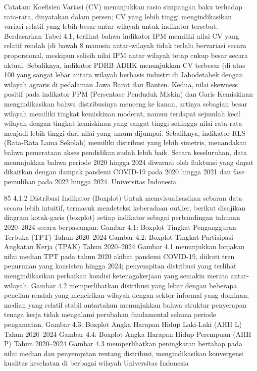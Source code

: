 Catatan: Koefisien Variasi (CV) menunjukkan rasio simpangan baku terhadap rata-rata,
dinyatakan dalam persen; CV yang lebih tinggi mengindikasikan variasi relatif yang lebih
besar antar-wilayah untuk indikator tersebut.
Berdasarkan Tabel 4.1, terlihat bahwa indikator IPM memiliki nilai CV yang relatif
rendah (di bawah 8%
manusia antar-wilayah tidak terlalu bervariasi secara proporsional, meskipun selisih nilai
IPM antar wilayah tetap cukup besar secara aktual. Sebaliknya, indikator PDRB ADHK
menunjukkan CV terbesar (di atas 100%
yang sangat lebar antara wilayah berbasis industri di Jabodetabek dengan wilayah agraris
di pedalaman Jawa Barat dan Banten.
Kedua, nilai skewness positif pada indikator PPM (Persentase Penduduk Miskin)
dan Garis Kemiskinan mengindikasikan bahwa distribusinya menceng ke kanan, artinya
sebagian besar wilayah memiliki tingkat kemiskinan moderat, namun terdapat sejumlah
kecil wilayah dengan tingkat kemiskinan yang sangat tinggi sehingga nilai rata-rata menjadi
lebih tinggi dari nilai yang umum dijumpai. Sebaliknya, indikator RLS (Rata-Rata Lama
Sekolah) memiliki distribusi yang lebih simetris, menandakan bahwa pemerataan akses
pendidikan sudah lebih baik.
Secara keseluruhan, data menunjukkan bahwa periode 2020 hingga 2024 diwarnai
oleh fluktuasi yang dapat dikaitkan dengan dampak pandemi COVID-19 pada 2020 hingga
2021 dan fase pemulihan pada 2022 hingga 2024.
Universitas Indonesia

85
4.1.2 Distribusi Indikator (Boxplot)
Untuk memvisualisasikan sebaran data secara lebih intuitif, termasuk mendeteksi
keberadaan outlier, berikut disajikan diagram kotak-garis (boxplot) setiap indikator sebagai
perbandingan tahunan 2020–2024 secara berpasangan.
Gambar 4.1: Boxplot Tingkat
Pengangguran Terbuka (TPT) Tahun
2020–2024
Gambar 4.2: Boxplot Tingkat Partisipasi
Angkatan Kerja (TPAK) Tahun 2020–2024
Gambar 4.1 menunjukkan lonjakan nilai median TPT pada tahun 2020 akibat pandemi
COVID-19, diikuti tren penurunan yang konsisten hingga 2024; penyempitan distribusi
yang terlihat mengindikasikan perbaikan kondisi ketenagakerjaan yang semakin merata
antar-wilayah. Gambar 4.2 memperlihatkan distribusi yang lebar dengan beberapa pencilan
rendah yang mencirikan wilayah dengan sektor informal yang dominan; median yang relatif
stabil antartahun menunjukkan bahwa struktur penyerapan tenaga kerja tidak mengalami
perubahan fundamental selama periode pengamatan.
Gambar 4.3: Boxplot Angka Harapan
Hidup Laki-Laki (AHH L) Tahun
2020–2024
Gambar 4.4: Boxplot Angka Harapan
Hidup Perempuan (AHH P) Tahun
2020–2024
Gambar 4.3 memperlihatkan peningkatan bertahap pada nilai median dan penyempitan
rentang distribusi, mengindikasikan konvergensi kualitas kesehatan di berbagai wilayah
Universitas Indonesia

